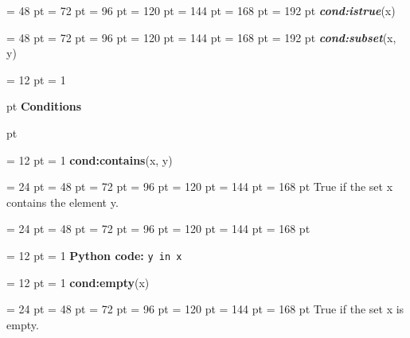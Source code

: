 {{{{\par \noindent  \leftskip = 48 pt  \leftmargini = 72 pt  \leftmarginii = 96 pt  \leftmarginiii = 120 pt  \leftmarginiv = 144 pt  \leftmarginv = 168 pt  \leftmarginvi = 192 pt  {\em {\bf {\large {\bf cond:istrue\/}}\/}\/}(x)\par}
{\par \noindent  \leftskip = 48 pt  \leftmargini = 72 pt  \leftmarginii = 96 pt  \leftmarginiii = 120 pt  \leftmarginiv = 144 pt  \leftmarginv = 168 pt  \leftmarginvi = 192 pt  {\em {\bf {\large {\bf cond:subset\/}}\/}\/}(x, y)\par}
\par}
\par}
{\par \pagebreak[3.300000] \noindent \hangindent = 12 pt \hangafter = 1 
{\par \pagebreak[3]  pt \noindent
{\Large {\bf Conditions\/}}\par {} pt
} \noindent
\par}
{\par \pagebreak[3.300000] \noindent \hangindent = 12 pt \hangafter = 1 
{\bf {\large {\bf cond:contains\/}}\/}(x, y)\par}
{\par \noindent  \leftskip = 24 pt  \leftmargini = 48 pt  \leftmarginii = 72 pt  \leftmarginiii = 96 pt  \leftmarginiv = 120 pt  \leftmarginv = 144 pt  \leftmarginvi = 168 pt  True if the set x contains the element y.\par}
{\par \noindent  \leftskip = 24 pt  \leftmargini = 48 pt  \leftmarginii = 72 pt  \leftmarginiii = 96 pt  \leftmarginiv = 120 pt  \leftmarginv = 144 pt  \leftmarginvi = 168 pt {\par \noindent
{\par \pagebreak[3.200000] \noindent \hangindent = 12 pt \hangafter = 1 
{\bf Python code: \/}{\tt y in x\/}\par}
\par}
\par}
{\par \pagebreak[3.300000] \noindent \hangindent = 12 pt \hangafter = 1 
{\bf {\large {\bf cond:empty\/}}\/}(x)\par}
{\par \noindent  \leftskip = 24 pt  \leftmargini = 48 pt  \leftmarginii = 72 pt  \leftmarginiii = 96 pt  \leftmarginiv = 120 pt  \leftmarginv = 144 pt  \leftmarginvi = 168 pt  True if the set x is empty.\par}
}
